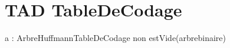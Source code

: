 \documentclass{article}
\begin{document}
\section{TAD TableDeCodage}
\begin{algorithme}
	{a : ArbreHuffmann}{TableDeCodage}
	{non estVide(arbrebinaire)}
\end{algorithme}
\end{document}
